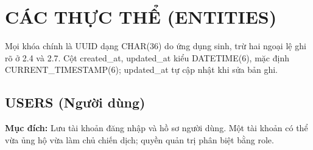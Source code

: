 \section{CÁC THỰC THỂ (ENTITIES)}\label{sec:chuong2}

Mọi khóa chính là UUID dạng CHAR(36) do ứng dụng sinh, trừ hai ngoại lệ ghi rõ ở 2.4 và 2.7. Cột created\_\allowbreak{}at, updated\_\allowbreak{}at kiểu DATETIME(6), mặc định CURRENT\_\allowbreak{}TIMESTAMP(6); updated\_\allowbreak{}at tự cập nhật khi sửa bản ghi.

\subsection{USERS (Người dùng)}

\textbf{Mục đích:} Lưu tài khoản đăng nhập và hồ sơ người dùng. Một tài khoản có thể vừa ủng hộ vừa làm chủ chiến dịch; quyền quản trị phân biệt bằng role.


